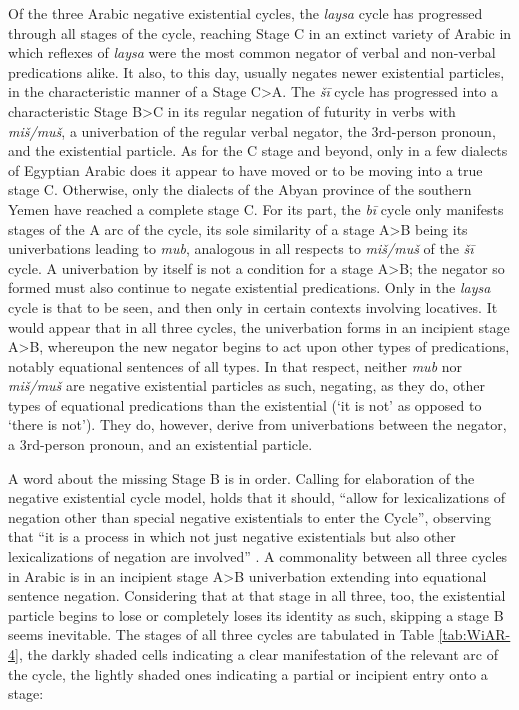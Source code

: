 \documentclass[output=paper]{langsci/langscibook}
\begin{document}
Of the three Arabic negative existential cycles, the \textit{laysa} cycle has progressed through all stages of the cycle, reaching Stage C in an extinct variety of Arabic in which reflexes of \textit{laysa} were the most common negator of verbal and non-verbal predications alike. It also, to this day, usually negates newer existential particles, in the characteristic manner of a Stage C>A. The \textit{šī} cycle has progressed into a characteristic Stage B>C in its regular negation of futurity in verbs with \textit{miš/muš}, a univerbation of the regular verbal negator, the 3rd-person pronoun, and the existential particle. As for the C stage and beyond, only in a few dialects of Egyptian Arabic does it appear to have moved or to be moving into a true stage C. Otherwise, only the dialects of the Abyan province of the southern Yemen have reached a complete stage C. For its part, the \textit{bī} cycle only manifests stages of the A arc of the cycle, its sole similarity of a stage A>B being its univerbations leading to \textit{mub}, analogous in all respects to \textit{miš/muš} of the \textit{šī} cycle. A univerbation by itself is not a condition for a stage A>B; the negator so formed must also continue to negate existential predications. Only in the \textit{laysa} cycle is that to be seen, and then only in certain contexts involving locatives. It would appear that in all three cycles, the univerbation forms in an incipient stage A>B, whereupon the new negator begins to act upon other types of predications, notably equational sentences of all types. In that respect, neither \textit{mub} nor \textit{miš/muš} are negative existential particles as such, negating, as they do, other types of equational predications than the existential (‘it is not’ as opposed to ‘there is not’). They do, however, derive from univerbations between the negator, a 3rd-person pronoun, and an existential particle.

A word about the missing Stage B is in order. Calling for elaboration of the negative existential cycle model, \citet{Veselinova2014} holds that it should, “allow for lexicalizations of negation other than special negative existentials to enter the Cycle”, observing that “it is a process in which not just negative existentials but also other lexicalizations of negation are involved” \citeyearpar[1338, 1139]{Veselinova2014}. A commonality between all three cycles in Arabic is in an incipient stage A>B univerbation extending into equational sentence negation. Considering that at that stage in all three, too, the existential particle begins to lose or completely loses its identity as such, skipping a stage B seems inevitable. The stages of all three cycles are tabulated in Table \ref{tab:WiAR-4}, the darkly shaded cells indicating a clear manifestation of the relevant arc of the cycle, the lightly shaded ones indicating a partial or incipient entry onto a stage:
\end{document}
